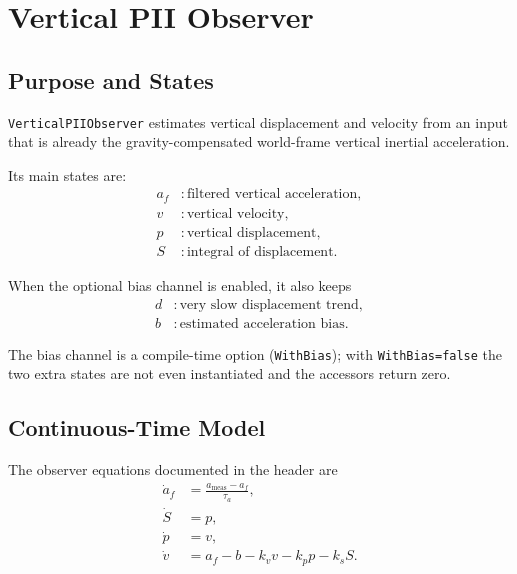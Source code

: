 \documentclass[conference]{IEEEtran}
\begin{document}
    \section{Vertical PII Observer}\label{sec:pii}

    \subsection{Purpose and States}

    \texttt{VerticalPIIObserver} estimates vertical displacement and velocity from
    an input that is already the gravity-compensated world-frame vertical inertial
    acceleration.

    Its main states are:
    \begin{align}
        a_f &: \text{filtered vertical acceleration},\\
        v   &: \text{vertical velocity},\\
        p   &: \text{vertical displacement},\\
        S   &: \text{integral of displacement}.
    \end{align}

    When the optional bias channel is enabled, it also keeps
    \begin{align}
        d &: \text{very slow displacement trend},\\
        b &: \text{estimated acceleration bias}.
    \end{align}

    The bias channel is a compile-time option (\texttt{WithBias}); with
    \texttt{WithBias=false} the two extra states are not even instantiated and
    the accessors return zero.

    \subsection{Continuous-Time Model}

    The observer equations documented in the header are
    \begin{align}
        \dot{a}_f &= \frac{a_{\mathrm{meas}} - a_f}{\tau_a}, \label{eq:afdot}\\
        \dot{S}   &= p, \label{eq:Sdot}\\
        \dot{p}   &= v, \label{eq:pdot}\\
        \dot{v}   &= a_f - b - k_v v - k_p p - k_s S. \label{eq:vdot}
    \end{align}
\end{document}
